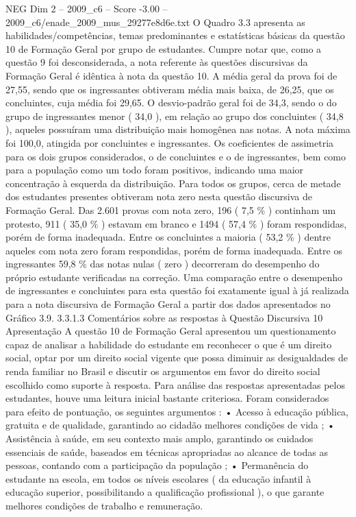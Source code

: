 \begin{textsample}{NEG Dim 2 – 2009\_c6 – Score -3.00 – 2009\_c6/enade\_2009\_mus\_29277e8d6e.txt}
O Quadro 3.3 apresenta as habilidades/competências, temas predominantes e estatísticas básicas da questão 10 de Formação Geral por grupo de estudantes.
Cumpre notar que, como a questão 9 foi desconsiderada, a nota referente às questões discursivas da Formação Geral é idêntica à nota da questão 10.
A média geral da prova foi de 27,55, sendo que os ingressantes obtiveram média mais baixa, de 26,25, que os concluintes, cuja média foi 29,65.
O desvio-padrão geral foi de 34,3, sendo o do grupo de ingressantes menor ( 34,0 ), em relação ao grupo dos concluintes ( 34,8 ), aqueles possuíram uma distribuição mais homogênea nas notas.
A nota máxima foi 100,0, atingida por concluintes e ingressantes.
Os coeficientes de assimetria para os dois grupos considerados, o de concluintes e o de ingressantes, bem como para a população como um todo foram positivos, indicando uma maior concentração à esquerda da distribuição.
Para todos os grupos, cerca de metade dos estudantes presentes obtiveram nota zero nesta questão discursiva de Formação Geral.
Das 2.601 provas com nota zero, 196 ( 7,5 \% ) continham um protesto, 911 ( 35,0 \% ) estavam em branco e 1494 ( 57,4 \% ) foram respondidas, porém de forma inadequada.
Entre os concluintes a maioria ( 53,2 \% ) dentre aqueles com nota zero foram respondidas, porém de forma inadequada.
Entre os ingressantes 59,8 \% das notas nulas ( zero ) decorreram do desempenho do próprio estudante verificadas na correção.
Uma comparação entre o desempenho de ingressantes e concluintes para esta questão foi exatamente igual à já realizada para a nota discursiva de Formação Geral a partir dos dados apresentados no Gráfico 3.9. 3.3.1.3 Comentários sobre as respostas à Questão Discursiva 10 Apresentação A questão 10 de Formação Geral apresentou um questionamento capaz de analisar a habilidade do estudante em reconhecer o que é um direito social, optar por um direito social vigente que possa diminuir as desigualdades de renda familiar no Brasil e discutir os argumentos em favor do direito social escolhido como suporte à resposta.
Para análise das respostas apresentadas pelos estudantes, houve uma leitura inicial bastante criteriosa.
Foram considerados para efeito de pontuação, os seguintes argumentos : • Acesso à educação pública, gratuita e de qualidade, garantindo ao cidadão melhores condições de vida ; • Assistência à saúde, em seu contexto mais amplo, garantindo os cuidados essenciais de saúde, baseados em técnicas apropriadas ao alcance de todas as pessoas, contando com a participação da população ; • Permanência do estudante na escola, em todos os níveis escolares ( da educação infantil à educação superior, possibilitando a qualificação profissional ), o que garante melhores condições de trabalho e remuneração.

\end{textsample}
